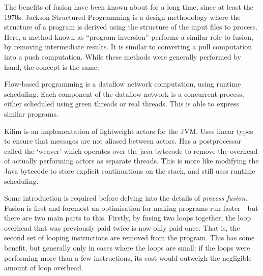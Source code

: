 % 


The benefits of fusion have been known about for a long time, since at least the 1970s.
Jackson Structured Programming \citep{jackson2002jsp} is a design methodology where the structure of a program is derived using the structure of the input files to process.
Here, a method known as ``program inversion'' performs a similar role to fusion, by removing intermediate results.
It is similar to converting a pull computation into a push computation.
While these methods were generally performed by hand, the concept is the same.

Flow-based programming \cite{morrison2010flow} is a dataflow network computation, using runtime scheduling.
Each component of the dataflow network is a concurrent process, either scheduled using green threads or real threads.
This is able to express similar programs.


Kilim \cite{srinivasan2010kilim} is an implementation of lightweight actors for the JVM.
Uses linear types to ensure that messages are not aliased between actors.
Has a postprocessor called the `weaver' which operates over the java bytecode to
remove the overhead of actually performing actors as separate threads.
This is more like modifying the Java bytecode to store explicit continuations on the stack, and still uses runtime scheduling.


Some introduction is required before delving into the details of \emph{process fusion}.
Fusion is first and foremost an optimisation for making programs run faster - but there are two main parts to this.
Firstly, by fusing two loops together, the loop overhead that was previously paid twice is now only paid once.
That is, the second set of looping instructions are removed from the program.
This has some benefit, but generally only in cases where the loops are small: if the loops were performing more than a few instructions, its cost would outweigh the negligible amount of loop overhead.

